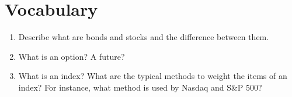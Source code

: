 \section{Vocabulary}
\begin{enumerate}
    \item Describe what are bonds and stocks and the difference between them.
    \item What is an option? A future?
    \item What is an index? What are the typical methods to weight the items of an index? For instance, what method is used by Nasdaq and S\&P 500?
\end{enumerate}

